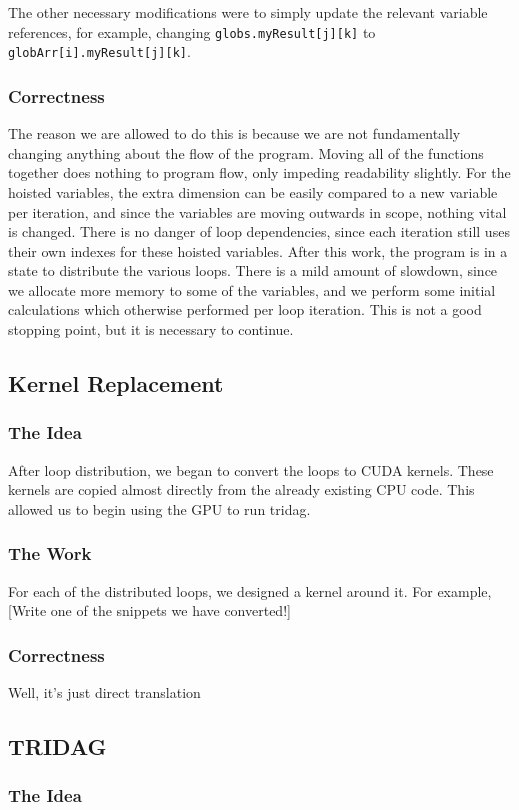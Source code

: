 \documentclass[]{report}
\begin{document}
The other necessary modifications were to simply update the relevant variable references, for example, changing \texttt{globs.myResult[j][k]} to\\ \texttt{globArr[i].myResult[j][k]}.
\subsubsection{Correctness}
The reason we are allowed to do this is because we are not fundamentally changing anything about the flow of the program. Moving all of the functions together does nothing to program flow, only impeding readability slightly. For the hoisted variables, the extra dimension can be easily compared to a new variable per iteration, and since the variables are moving outwards in scope, nothing vital is changed. There is no danger of loop dependencies, since each iteration still uses their own indexes for these hoisted variables.
After this work, the program is in a state to distribute the various loops. There is a mild amount of slowdown, since we allocate more memory to some of the variables, and we perform some initial calculations which otherwise performed per loop iteration. This is not a good stopping point, but it is necessary to continue.
\subsection{Kernel Replacement}
\subsubsection{The Idea}
After loop distribution, we began to convert the loops to CUDA kernels. These kernels are copied almost directly from the already existing CPU code. This allowed us to begin using the GPU to run tridag.
\subsubsection{The Work}
For each of the distributed loops, we designed a kernel around it. For example, 
[Write one of the snippets we have converted!]
\subsubsection{Correctness}
Well, it's just direct translation
\subsection{TRIDAG}
\subsubsection{The Idea}
\end{document}
